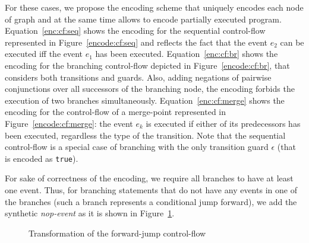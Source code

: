 For these cases, we propose the encoding scheme that uniquely encodes each node of graph and at the same time allows to encode partially executed program.
Equation~\ref{enc:cf:seq} shows the encoding for the sequential control-flow represented in Figure~\ref{encode:cf:seq} and reflects the fact that the event $e_2$ can be executed iff the event $e_1$ has been executed.
Equation~\ref{enc:cf:br} shows the encoding for the branching control-flow depicted in Figure~\ref{encode:cf:br}, that considers both transitions and guards.
Also, adding negations of pairwise conjunctions over all successors of the branching node, the encoding forbids the execution of two branches simultaneously.
Equation~\ref{enc:cf:merge} shows the encoding for the control-flow of a merge-point represented in Figure~\ref{encode:cf:merge}: the event $e_k$ is executed if either of its predecessors has been executed, regardless the type of the transition.
Note that the sequential control-flow is a special case of branching with the only transition guard $\epsilon$ (that is encoded as \texttt{true}).

For sake of correctness of the encoding, we require all branches to have at least one event.
Thus, for branching statements that do not have any events in one of the branches (such a branch represents a conditional jump forward), we add the synthetic \textit{nop-event} as it is shown in Figure~\ref{encode:branching:nop}.

\begin{figure}%
    \centering
    \caption{Transformation of the forward-jump control-flow}
    \label{encode:branching:nop}
\end{figure}

